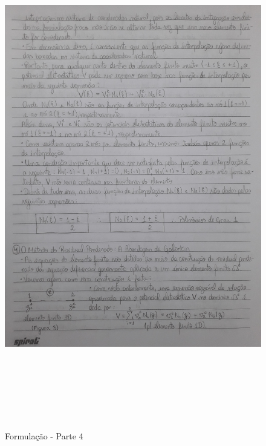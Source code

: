 \documentclass[10pt]{article}
\begin{document}
    \begin{figure}[!htb]
    \centerline{\includegraphics[width=20cm,height=22cm]{Formulação Matemática/Formulacao - Parte 4.jpg}}
    \caption{Formulação - Parte 4}
    \label{fig:fp4}
    \end{figure}
    
\end{document}
